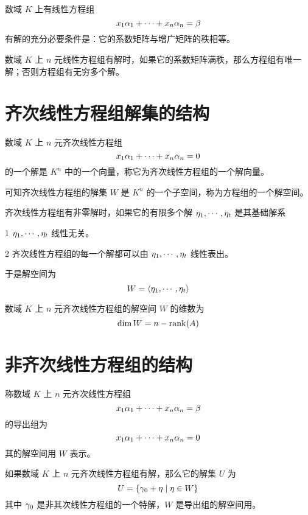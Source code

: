\begin{theorem}
	数域 $K$ 上有线性方程组
	\[x_1\alpha_1 + \cdots + x_n\alpha_n = \beta\]
	有解的充分必要条件是：它的系数矩阵与增广矩阵的秩相等。
\end{theorem}

\begin{theorem}
	数域 $K$ 上 $n$ 元线性方程组有解时，如果它的系数矩阵满秩，那么方程组有唯一解；否则方程组有无穷多个解。
\end{theorem}

\section{齐次线性方程组解集的结构}

数域 $K$ 上 $n$ 元齐次线性方程组
\[x_1\alpha_1 + \cdots + x_n\alpha_n = 0\]
的一个解是 $K^n$ 中的一个向量，称它为齐次线性方程组的一个解向量。

可知齐次线性方程组的解集 $W$ 是 $K^n$ 的一个子空间，称为方程组的一个解空间。

\begin{definition}
	齐次线性方程组有非零解时，如果它的有限多个解 $\eta_1,\cdots,\eta_t$ 是其基础解系

	\num{1} $\eta_1,\cdots,\eta_t$ 线性无关。

	\num{2} 齐次线性方程组的每一个解都可以由 $\eta_1,\cdots,\eta_t$ 线性表出。
\end{definition}

于是解空间为
\[W = \langle \eta_1,\cdots,\eta_t \rangle\]

\begin{theorem}
	数域 $K$ 上 $n$ 元齐次线性方程组的解空间 $W$ 的维数为
	\[\dim W = n-\operatorname{rank}(A)\]
\end{theorem}

\section{非齐次线性方程组的结构}

称数域 $K$ 上 $n$ 元齐次线性方程组
\[x_1\alpha_1 + \cdots + x_n\alpha_n = \beta\]
的导出组为
\[x_1\alpha_1 + \cdots + x_n\alpha_n = 0\]
其的解空间用 $W$ 表示。

\begin{theorem}
	如果数域 $K$ 上 $n$ 元齐次线性方程组有解，那么它的解集 $U$ 为
	\[U = \{\gamma_0+\eta \mid \eta \in W\}\]
	其中 $\gamma_0$ 是非其次线性方程组的一个特解，$W$ 是导出组的解空间用。
\end{theorem}
